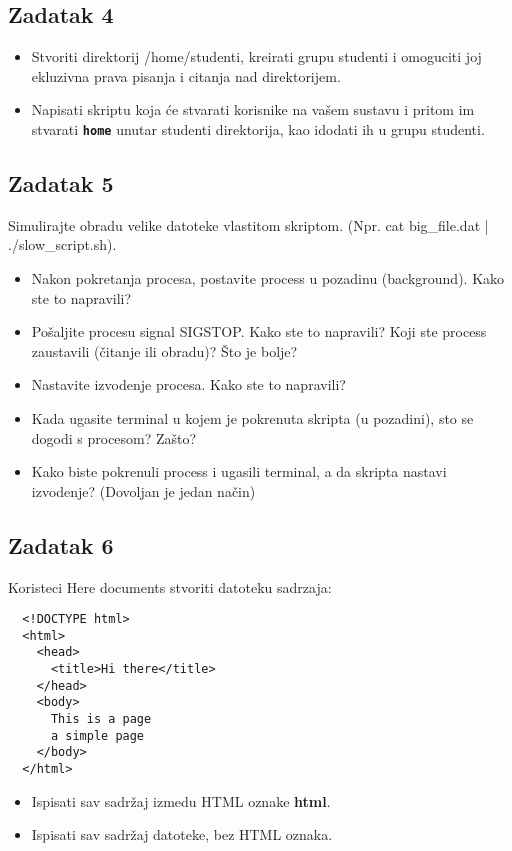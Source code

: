 \documentclass[12pt,a4paper]{article}
\newcommand{\shell}[1]{\texttt{\textbf{#1}}}
\begin{document}
	\subsection*{Zadatak 4}
	\begin{itemize}
		\item Stvoriti direktorij /home/studenti, kreirati grupu studenti i omoguciti joj ekluzivna prava pisanja i citanja nad direktorijem.
    \item Napisati skriptu koja će stvarati korisnike na vašem sustavu i pritom im stvarati \shell{home} unutar studenti direktorija, kao idodati ih u grupu studenti. 
	\end{itemize}
  
	\subsection*{Zadatak 5}
  Simulirajte obradu velike datoteke vlastitom skriptom. (Npr. cat big\_file.dat | ./slow\_script.sh).
	\begin{itemize}
    \item Nakon pokretanja procesa, postavite process u pozadinu (background). Kako ste to napravili?
    \item Pošaljite procesu signal SIGSTOP. Kako ste to napravili? Koji ste process zaustavili (čitanje ili obradu)? Što je bolje?
    \item Nastavite izvodenje procesa. Kako ste to napravili?
    \item Kada ugasite terminal u kojem je pokrenuta skripta (u pozadini), sto se dogodi s procesom? Zašto?
    \item Kako biste pokrenuli process i ugasili terminal, a da skripta nastavi izvodenje? (Dovoljan je jedan način)
	\end{itemize}

\subsection*{Zadatak 6}
  Koristeci Here documents stvoriti datoteku sadrzaja:
  \begin{verbatim}
  <!DOCTYPE html>
  <html>
    <head>
      <title>Hi there</title>
    </head>
    <body>
      This is a page
      a simple page
    </body>
  </html>
  \end{verbatim}
  \begin{itemize}
    \item Ispisati sav sadržaj izmedu HTML oznake \textbf{html}.
    \item Ispisati sav sadržaj datoteke, bez HTML oznaka.
  \end{itemize}
\end{document}
